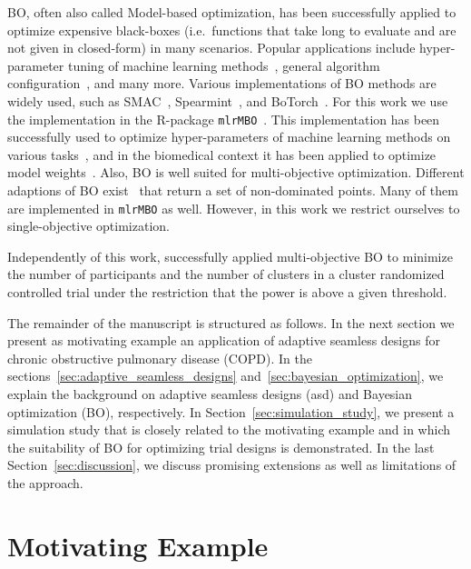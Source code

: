 \documentclass[bimj,fleqn]{w-art}
\theoremstyle{plain}
\theoremstyle{definition}
\begin{document}
BO, often also called Model-based optimization, has been successfully applied to optimize expensive black-boxes (i.e.\ functions that take long to evaluate and are not given in closed-form) in many scenarios.
Popular applications include hyper-parameter tuning of machine learning methods~\citep{snoek_practical_2012}, general algorithm configuration~\citep{hutter_sequential_2011}, and many more.
Various implementations of BO methods are widely used, such as SMAC~\citep{hutter_sequential_2011}, Spearmint~\citep{snoek_practical_2012}, and BoTorch~\citep{balandat_botorch_2020}.
For this work we use the implementation in the R-package \texttt{mlrMBO}~\citep{bischl_mlrmbo_2017}.
This implementation has been successfully used to optimize hyper-parameters of machine learning methods on various tasks~\citep{bischl_mlrmbo_2017, wozniak_candle_2018}, and in the biomedical context it has been applied to optimize model weights~\citep{richter_modelbased_2019,browaeys_nichenet_2020}.
Also, BO is well suited for multi-objective optimization.
Different adaptions of BO exist~\citep{horn_modelbased_2015} that return a set of non-dominated points.
Many of them are implemented in \texttt{mlrMBO} as well.
However, in this work we restrict ourselves to single-objective optimization. 

Independently of this work, \citet{wilson_efficient_2021} successfully applied multi-objective BO to minimize the number of participants and the number of clusters in a cluster randomized controlled trial under the restriction that the power is above a given threshold.

The remainder of the manuscript is structured as follows.
In the next section we present as motivating example an application of adaptive seamless designs for chronic obstructive pulmonary disease (COPD).
In the sections~\ref{sec:adaptive_seamless_designs} and~\ref{sec:bayesian_optimization}, we explain the background on adaptive seamless designs (asd) and Bayesian optimization (BO), respectively.
In Section~\ref{sec:simulation_study}, we present a simulation study that is closely related to the motivating example and in which the suitability of BO for optimizing trial designs is demonstrated.
In the last Section~\ref{sec:discussion}, we discuss promising extensions as well as limitations of the approach.

\section{Motivating Example}
\label{sec:motivating_example}
\end{document}
